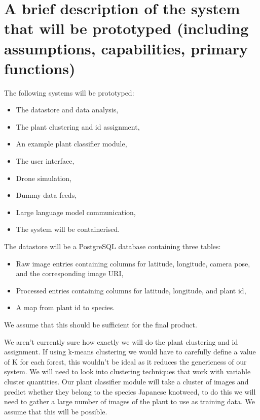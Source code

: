\documentclass{article}
\begin{document}
\section{A brief description of the system that will be prototyped (including assumptions, capabilities, primary functions)}


The following systems will be prototyped:
\begin{itemize}[noitemsep,topsep=3pt]
\item The datastore and data analysis,
\item The plant clustering and id assignment,
\item An example plant classifier module,
\item The user interface,
\item Drone simulation,
\item Dummy data feeds,
\item Large language model communication,
\item The system will be containerised.
\end{itemize}

\noindent
The datastore will be a PostgreSQL database containing three tables:
\begin{itemize}[noitemsep,topsep=3pt]
\item Raw image entries containing columns for latitude, longitude, camera pose, and the corresponding image URI,
\item Processed entries containing columns for latitude, longitude, and plant id,
\item A map from plant id to species.
\end{itemize}
We assume that this should be sufficient for the final product.

We aren't currently sure how exactly we will do the plant clustering and id assignment.
If using k-means clustering we would have to carefully define a value of K for each forest, this wouldn't be ideal as it reduces the genericness of our system.
We will need to look into clustering techniques that work with variable cluster quantities.
Our plant classifier module will take a cluster of images and predict whether they belong to the species Japanese knotweed, to do this we will need to gather a large number of images of the plant to use as training data. We assume that this will be possible. %
\end{document}
